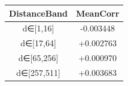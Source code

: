 \begin{table}[h]
\centering
\begin{tabular}{ |c|c| }
\hline
DistanceBand & MeanCorr \\
\hline
d∈[1,16] & -0.003448 \\
\hline
d∈[17,64] & +0.002763 \\
\hline
d∈[65,256] & +0.000970 \\
\hline
d∈[257,511] & +0.003683 \\
\hline
\end{tabular}
\end{table}

